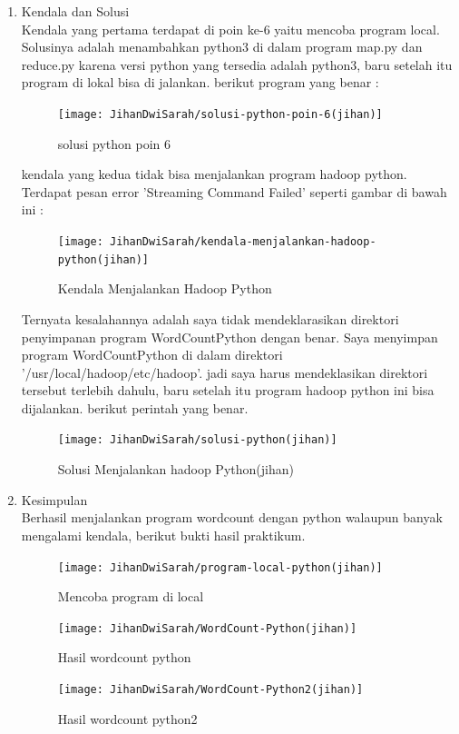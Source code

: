 \begin{enumerate}
\item Kendala dan Solusi \\
Kendala yang  pertama terdapat di poin ke-6 yaitu mencoba program local. Solusinya adalah menambahkan python3 di dalam program map.py dan reduce.py karena versi python yang tersedia adalah python3, baru setelah itu program di lokal bisa di jalankan. berikut program yang benar : \\
\begin{figure}[!ht]
\texttt{[image: JihanDwiSarah/solusi-python-poin-6(jihan)]}
\caption{solusi python poin 6}
\label{gam:solusi-python-poin-6(jihan)}
\end{figure} 

kendala yang kedua tidak bisa menjalankan program hadoop python. Terdapat pesan error 'Streaming Command Failed' seperti gambar di bawah ini :
\begin{figure}[!ht]
\texttt{[image: JihanDwiSarah/kendala-menjalankan-hadoop-python(jihan)]}
\caption{Kendala Menjalankan Hadoop Python}
\label{gam:kendala-menjalankan-hadoop-python(jihan)}
\end{figure} 

Ternyata kesalahannya adalah saya tidak mendeklarasikan direktori penyimpanan program WordCountPython dengan benar. Saya menyimpan program WordCountPython di dalam direktori '/usr/local/hadoop/etc/hadoop'. jadi saya harus mendeklasikan direktori tersebut terlebih dahulu, baru setelah itu program hadoop python ini bisa dijalankan. berikut perintah yang benar.
\begin{figure}[!ht]
\texttt{[image: JihanDwiSarah/solusi-python(jihan)]}
\caption{Solusi Menjalankan hadoop Python(jihan)}
\label{gam:solusi-python(jihan)}
\end{figure} 

\item Kesimpulan\\
Berhasil menjalankan program wordcount dengan python walaupun banyak mengalami kendala, berikut bukti hasil praktikum. 

\begin{figure}[!ht]
\texttt{[image: JihanDwiSarah/program-local-python(jihan)]}
\caption{Mencoba program di local}
\label{gam:program-local-python(jihan)}
\end{figure} 

\begin{figure}[!ht]
\texttt{[image: JihanDwiSarah/WordCount-Python(jihan)]}
\caption{Hasil wordcount python}
\label{gam:WordCount-Python(jihan)}
\end{figure} 



\begin{figure}[!ht]
\texttt{[image: JihanDwiSarah/WordCount-Python2(jihan)]}
\caption{Hasil wordcount python2}
\label{gam:WordCount-Python2(jihan)}
\end{figure} 

\end{enumerate}

